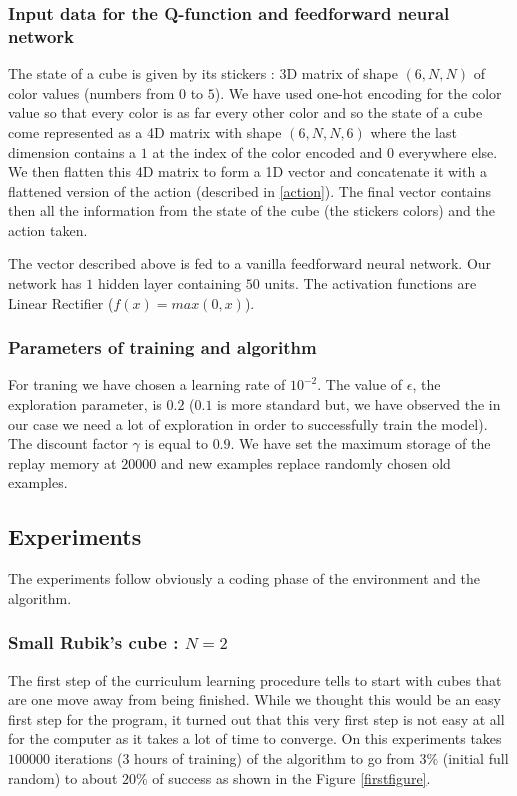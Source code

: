 \documentclass{article} %
\begin{document}
\subsubsection{Input data for the Q-function and feedforward neural network}
The state of a cube is given by its stickers : 3D matrix of shape $(6, N, N)$ of color values (numbers from $0$ to $5$). We have used one-hot encoding for the color value so that every color is as far every other color and so the state of a cube come represented as a 4D matrix with shape $(6, N, N, 6)$ where the last dimension contains a $1$ at the index of the color encoded and $0$ everywhere else. We then flatten this 4D matrix to form a 1D vector and concatenate it with a flattened version of the action (described in \ref{action}). The final vector contains then all the information from the state of the cube (the stickers colors) and the action taken.

The vector described above is fed to a vanilla feedforward neural network. Our network has $1$ hidden layer containing $50$ units. The activation functions are Linear Rectifier ($f(x) = max(0, x)$).

\subsubsection{Parameters of training and algorithm}
For traning we have chosen a learning rate of $10^{-2}$. The value of $\epsilon$, the exploration parameter, is $0.2$ ($0.1$ is more standard but, we have observed the in our case we need a lot of exploration in order to successfully train the model). The discount factor $\gamma$ is equal to $0.9$. We have set the maximum storage of the replay memory at $20000$ and new examples replace randomly chosen old examples.

\subsection{Experiments}
The experiments follow obviously a coding phase of the environment and the algorithm.

\subsubsection{Small Rubik's cube : $N=2$}
The first step of the curriculum learning procedure tells to start with cubes that are one move away from being finished. While we thought this would be an easy first step for the program, it turned out that this very first step is not easy at all for the computer as it takes a lot of time to converge. On this experiments takes $100000$ iterations (3 hours of training) of the algorithm to go from $3$\% (initial full random) to about $20$\% of success as shown in the Figure \ref{firstfigure}.
\end{document}
